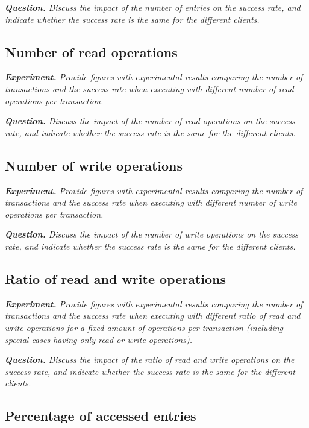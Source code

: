 \documentclass[a4paper, 10pt]{article}
\begin{document}
{\setlength{\parskip}{10pt}\noindent\textit{\textbf{Question.} Discuss the impact of the number of entries on the success rate, and indicate whether the success rate is the same for the different clients.}}

\subsection{Number of read operations}

\textit{\textbf{Experiment.} Provide figures with experimental results comparing the number of transactions and the success rate when executing with different number of read operations per transaction.}

{\setlength{\parskip}{10pt}\noindent\textit{\textbf{Question.} Discuss the impact of the number of read operations on the success rate, and indicate whether the success rate is the same for the different clients.}}

\subsection{Number of write operations}

\textit{\textbf{Experiment.} Provide figures with experimental results comparing the number of transactions and the success rate when executing with different number of write operations per transaction.}

{\setlength{\parskip}{10pt}\noindent\textit{\textbf{Question.} Discuss the impact of the number of write operations on the success rate, and indicate whether the success rate is the same for the different clients.}}

\subsection{Ratio of read and write operations}

\textit{\textbf{Experiment.} Provide figures with experimental results comparing the number of transactions and the success rate when executing with different ratio of read and write operations for a fixed amount of operations per transaction (including special cases having only read or write operations).}

{\setlength{\parskip}{10pt}\noindent\textit{\textbf{Question.} Discuss the impact of the ratio of read and write operations on the success rate, and indicate whether the success rate is the same for the different clients.}}

\subsection{Percentage of accessed entries}
\end{document}
